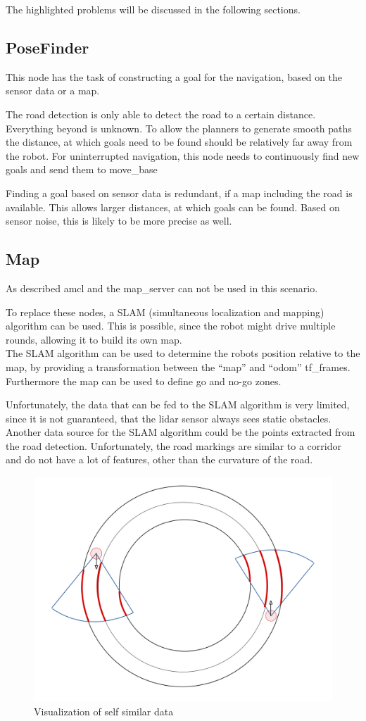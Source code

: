 The highlighted problems will be discussed in the following sections.



\subsection{PoseFinder}

This node has the task of constructing a goal for the navigation, based on the sensor data or a map.

The road detection is only able to detect the road to a certain distance. Everything beyond is unknown. 
To allow the planners to generate smooth paths the distance, at which goals need to be found should be relatively far away from the robot.
For uninterrupted navigation, this node needs to continuously find new goals and send them to move\_base

Finding a goal based on sensor data is redundant, if a map including the road is available. This allows larger distances, at which goals can be found. Based on sensor noise, this is likely to be more precise as well.

\subsection{Map}
As described amcl and the map\_server can not be used in this scenario.

To replace these nodes, a SLAM (simultaneous localization and mapping) algorithm can be used.
This is possible, since the robot might drive multiple rounds, allowing it to build its own map.\\

The SLAM algorithm can be used to determine the robots position relative to the map, by providing a transformation between the ``map'' and ``odom'' tf\_frames. Furthermore the map can be used to define go and no-go zones.

Unfortunately, the data that can be fed to the SLAM algorithm is very limited, since it is not guaranteed, that the lidar sensor always sees static obstacles. Another data source for the SLAM algorithm could be the points extracted from the road detection. Unfortunately, the road markings are similar to a corridor and do not have a lot of features, other than the curvature of the road.\\

\begin{figure}[H]
	\centering
	\includegraphics[width=.5\textwidth]{Pictures/selfsimillar}
	\caption{Visualization of self similar data}
	\label{selfsimilar}
\end{figure}

